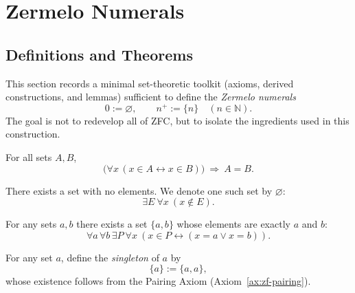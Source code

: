 
\section{Zermelo Numerals}
\label{sec:zermelo-numerals}

\subsection*{Definitions and Theorems}

\begin{remark}[Purpose]
This section records a minimal set-theoretic toolkit (axioms, derived constructions,
and lemmas) sufficient to define the \emph{Zermelo numerals}
\[
0 := \varnothing,\qquad n^{+} := \{n\}\quad (n \in \mathbb{N}).
\]
The goal is not to redevelop all of ZFC, but to isolate the ingredients used in this construction.
\end{remark}


\begin{axiom}[Extensionality]
\label{ax:zf-extensionality}
For all sets $A,B$,
\[
\bigl(\forall x\,(x\in A \leftrightarrow x\in B)\bigr)\ \Rightarrow\ A=B.
\]
\end{axiom}

\begin{axiom}
\label{ax:zf-empty-set}
There exists a set with no elements. We denote one such set by $\varnothing$:
\[
\exists E\ \forall x\ (x\notin E).
\]
\end{axiom}

\begin{axiom}[Pairing]
\label{ax:zf-pairing}
For any sets $a,b$ there exists a set $\{a,b\}$ whose elements are exactly $a$ and $b$:
\[
\forall a\,\forall b\,\exists P\ \forall x\ (x\in P \leftrightarrow (x=a \lor x=b)).
\]
\end{axiom}

\begin{definition}[Singleton]
\label{def:singleton}
For any set $a$, define the \emph{singleton} of $a$ by
\[
\{a\} := \{a,a\},
\]
whose existence follows from the Pairing Axiom (Axiom~\ref{ax:zf-pairing}).
\end{definition}

